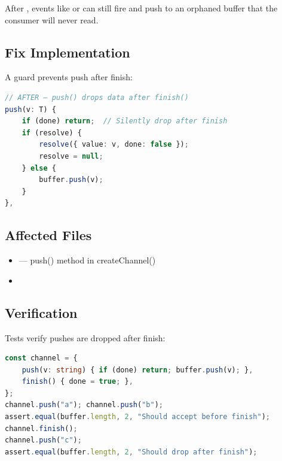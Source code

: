After , events like  or  can still fire and push to an orphaned buffer that the consumer will never read.

\subsection*{Fix Implementation}
A guard prevents push after finish:

\begin{lstlisting}[language=TypeScript]
// AFTER — push() drops data after finish()
push(v: T) {
    if (done) return;  // Silently drop after finish
    if (resolve) {
        resolve({ value: v, done: false });
        resolve = null;
    } else {
        buffer.push(v);
    }
},
\end{lstlisting}

\subsection*{Affected Files}
\begin{itemize}
    \item {} — push() method in createChannel()
    \item {}
\end{itemize}

\subsection*{Verification}
Tests verify pushes are dropped after finish:

\begin{lstlisting}[language=TypeScript]
const channel = {
    push(v: string) { if (done) return; buffer.push(v); },
    finish() { done = true; },
};
channel.push("a"); channel.push("b");
assert.equal(buffer.length, 2, "Should accept before finish");
channel.finish();
channel.push("c");
assert.equal(buffer.length, 2, "Should drop after finish");
\end{lstlisting}
